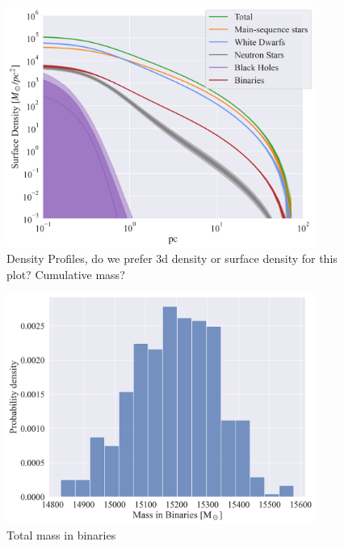 \begin{figure}
	\begin{center}
		\includegraphics[width=0.9\textwidth]{figures/low_bin_model/surface_dens.png}
	\end{center}
	\caption{Density Profiles, do we prefer 3d density or surface density for this plot? Cumulative mass?}
	\label{fig:low_bin_model_densities}
\end{figure}


\begin{figure}
	\begin{center}
		\includegraphics[width=0.9\textwidth]{figures/low_bin_model/binary_mass.png}
	\end{center}
	\caption{Total mass in binaries}
	\label{fig:low_bin_model_binary_mass}
\end{figure}

